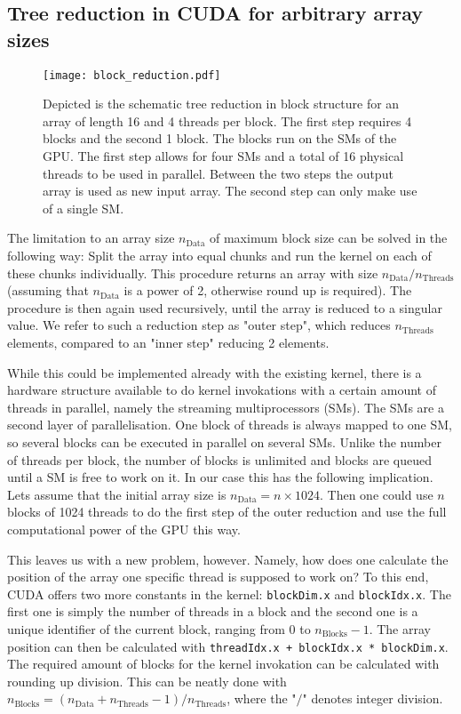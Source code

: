\subsection{Tree reduction in CUDA for arbitrary array sizes}
\begin{figure}
    \centering
    \texttt{[image: block\_reduction.pdf]}
    \caption{
        Depicted is the schematic tree reduction in block structure for an array of length 16 and 4 threads per block.
        The first step requires 4 blocks and the second 1 block.
        The blocks run on the SMs of the GPU.
        The first step allows for four SMs and a total of 16 physical threads to be used in parallel.
        Between the two steps the output array is used as new input array.
        The second step can only make use of a single SM.
    }
\end{figure}
The limitation to an array size \( n_{\mathrm{Data}}\) of maximum block size can be solved in the following way:
Split the array into equal chunks and run the kernel on each of these chunks individually.
This procedure returns an array with size \( n_{\mathrm{Data}}/ n_{\mathrm{Threads}} \) (assuming that \( n_{\mathrm{Data}} \) is a power of 2, otherwise round up is required).
The procedure is then again used recursively, until the array is reduced to a singular value.
We refer to such a reduction step as "outer step", which reduces \( n_{\mathrm{Threads}} \) elements, compared to an "inner step" reducing 2 elements.

While this could be implemented already with the existing kernel, there is a hardware structure available to do kernel invokations with a certain amount of threads in parallel, namely the streaming multiprocessors (SMs).
The SMs are a second layer of parallelisation.
One block of threads is always mapped to one SM, so several blocks can be executed in parallel on several SMs.
Unlike the number of threads per block, the number of blocks is unlimited and blocks are queued until a SM is free to work on it.
In our case this has the following implication.
Lets assume that the initial array size is \( n_{\mathrm{Data}} = n \times 1024 \).
Then one could use \( n \) blocks of 1024 threads to do the first step of the outer reduction and use the full computational power of the GPU this way.

This leaves us with a new problem, however.
Namely, how does one calculate the position of the array one specific thread is supposed to work on?
To this end, CUDA offers two more constants in the kernel:
\texttt{blockDim.x} and \texttt{blockIdx.x}.
The first one is simply the number of threads in a block and the second one is a unique identifier of the current block, ranging from 0 to \( n_{\mathrm{Blocks}} - 1\).
The array position can then be calculated with \texttt{threadIdx.x + blockIdx.x * blockDim.x}.
The required amount of blocks for the kernel invokation can be calculated with rounding up division.
This can be neatly done with \( n_{\mathrm{Blocks}} = (n_{\mathrm{Data}} + n_{\mathrm{Threads}} - 1) / n_{\mathrm{Threads}} \), where the "\( / \)" denotes integer division.

